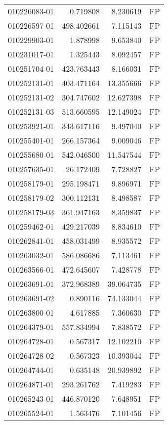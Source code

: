 \begin{tabular}{lrrl}
010226083-01 &    0.719808 &     8.230619 &   FP \\
010226597-01 &  498.402661 &     7.115143 &   FP \\
010229903-01 &    1.878998 &     9.653840 &   FP \\
010231017-01 &    1.325443 &     8.092457 &   FP \\
010251704-01 &  423.763443 &     8.166031 &   FP \\
010252131-01 &  403.471164 &    13.355666 &   FP \\
010252131-02 &  304.747602 &    12.627398 &   FP \\
010252131-03 &  513.660595 &    12.149024 &   FP \\
010253921-01 &  343.617116 &     9.497040 &   FP \\
010255401-01 &  266.157364 &     9.009046 &   FP \\
010255680-01 &  542.046500 &    11.547544 &   FP \\
010257635-01 &   26.172409 &     7.728827 &   FP \\
010258179-01 &  295.198471 &     9.896971 &   FP \\
010258179-02 &  300.112131 &     8.498587 &   FP \\
010258179-03 &  361.947163 &     8.359837 &   FP \\
010259462-01 &  429.217039 &     8.834610 &   FP \\
010262841-01 &  458.031499 &     8.935572 &   FP \\
010263032-01 &  586.086686 &     7.113461 &   FP \\
010263566-01 &  472.645607 &     7.428778 &   FP \\
010263691-01 &  372.968389 &    39.064735 &   FP \\
010263691-02 &    0.890116 &    74.133044 &   FP \\
010263800-01 &    4.617885 &     7.360630 &   FP \\
010264379-01 &  557.834994 &     7.838572 &   FP \\
010264728-01 &    0.567317 &    12.102210 &   FP \\
010264728-02 &    0.567323 &    10.393044 &   FP \\
010264744-01 &    0.635148 &    20.939892 &   FP \\
010264871-01 &  293.261762 &     7.419283 &   FP \\
010265243-01 &  446.870120 &     7.648951 &   FP \\
010265524-01 &    1.563476 &     7.101456 &   FP \\

\end{tabular}
